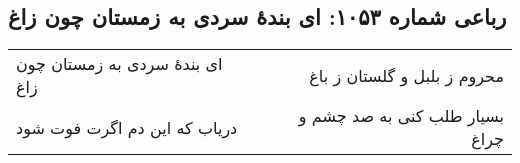 \begin{center}
\section*{رباعی شماره ۱۰۵۳: ای بندهٔ سردی به زمستان چون زاغ}
\label{sec:1053}
\begin{longtable}{l p{0.5cm} r}
ای بندهٔ سردی به زمستان چون زاغ
&&
محروم ز بلبل و گلستان ز باغ
\\
دریاب که این دم اگرت فوت شود
&&
بسیار طلب کنی به صد چشم و چراغ
\\
\end{longtable}
\end{center}

